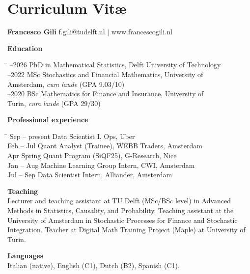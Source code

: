 \chapter{Curriculum Vit\ae}

\noindent\textbf{Francesco Gili} \hfill f.gili@tudelft.nl $\mid$ www.francescogili.nl

\bigskip
\noindent\textbf{Education}
\begin{tabbing}
\hspace{1em}\=\hspace{9em}\=\kill
{}--2026 \> PhD in Mathematical Statistics, Delft University of Technology \\
--2022 \> MSc Stochastics and Financial Mathematics,  University of\\
\>\> Amsterdam, \textit{cum laude} (GPA 9.03/10) \\
--2020 \> BSc Mathematics for Finance and Insurance, University of \\
\>\>Turin, \textit{cum laude} (GPA 29/30) \\
\end{tabbing}

\noindent\textbf{Professional experience}
\begin{tabbing}
\hspace{1em}\=\hspace{13em}\=\kill
{} Sep -- present \> Data Scientist I, Ops, Uber \\
 Feb -- Jul \> Quant Analyst (Trainee), WEBB Traders, Amsterdam \\
 Apr \> Spring Quant Program (SiQF25), G-Research, Nice \\
 Jan -- Aug \> Machine Learning Group Intern, CWI, Amsterdam \\
 Jul -- Sep \> Data Scientist Intern, Alliander, Amsterdam \\
\end{tabbing}

\noindent\textbf{Teaching} \\[4pt]
Lecturer and teaching assistant at TU Delft (MSc/BSc level) in Advanced Methods in Statistics, Causality, and Probability. Teaching assistant at the University of Amsterdam in Stochastic Processes for Finance and Stochastic Integration. Teacher at Digital Math Training Project (Maple) at University of Turin.

\bigskip
\noindent\textbf{Languages} \\[4pt]
Italian (native), English (C1), Dutch (B2), Spanish (C1).


